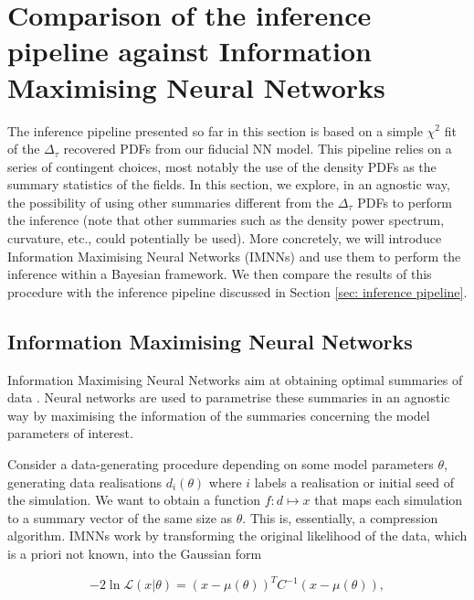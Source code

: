 














\section{Comparison of the inference pipeline against Information Maximising Neural Networks}


The inference pipeline presented so far in this section is based on a simple $\chi^2$ fit of the $\Delta_\tau$ recovered PDFs from our fiducial NN model. This pipeline relies on a series of contingent choices, most notably the use of the density PDFs as the summary statistics of the fields. In this section, we explore, in an agnostic way, the possibility of using other summaries different from the $\Delta_\tau$ PDFs to perform the inference (note that other summaries such as the density power spectrum, curvature, etc., could potentially be used). More concretely, we will introduce Information Maximising Neural Networks (IMNNs) and use them to perform the inference within a Bayesian framework. We then compare the results of this procedure with the inference pipeline discussed in Section \ref{sec: inference pipeline}.

\subsection{Information Maximising Neural Networks}
Information Maximising Neural Networks aim at obtaining optimal summaries of data \cite{Charnock_2018}. Neural networks are used to parametrise these summaries in an agnostic way by maximising the information of the summaries concerning the model parameters of interest.

Consider a data-generating procedure depending on some model parameters $\theta$, generating data realisations $d_i(\theta)$ where $i$ labels a realisation or initial seed of the simulation. We want to obtain a function $f \colon d \mapsto x$ that maps each simulation to a summary vector of the same size as $\theta$. This is, essentially, a compression algorithm. IMNNs work by transforming the original likelihood of the data, which is a priori not known, into the Gaussian form

\begin{equation}
    -2\ln\mathcal{L}\left(x|\theta\right)=\left(x-\mu\left(\theta\right)\right)^TC^{-1}\left(x-\mu\left(\theta\right)\right),
\end{equation}

